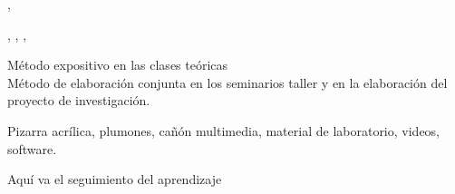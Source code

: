 \documentclass[a4paper,8pt]{article}
\begin{document}
\begin{contenidos}
\cite{matloff}, \cite{quinn} 


\nextUnidad{\PDParallelPerformance}
\nextCapitulo{\PDParallelPerformance}
\nextTema{\PDParallelPerformanceTopicLoad}
\nextTema{\PDParallelPerformanceTopicPerformance}
\nextTema{\PDParallelPerformanceTopicScheduling}
\nextTema{\PDParallelPerformanceTopicEvaluating}
\nextTema{\PDParallelPerformanceTopicData}
\nextTema{\PDParallelPerformanceTopicPower}

\cite{peterpacheco}, \cite{matloff}, \cite{wenmei}, \cite{sanders} 





\end{contenidos}




\begin{estrategiasEnsenanza}
    \begin{metodos}
        Método expositivo en las clases teóricas \\
        Método de elaboración conjunta en los seminarios taller y en la elaboración del proyecto de investigación.
    \end{metodos}
    \begin{medios}
        Pizarra acrílica, plumones, cañón multimedia, material de laboratorio, videos, software.
    \end{medios}
    \begin{formasOrganizacion}
    \end{formasOrganizacion}
    \begin{programacion}
    \end{programacion}
    \begin{segumientoAprendizaje}
        Aquí va el seguimiento del aprendizaje
    \end{segumientoAprendizaje}
\end{estrategiasEnsenanza}
\end{document}
